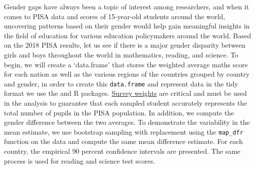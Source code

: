 Gender gaps have always been a topic of interest among researchers, and
when it comes to PISA data and scores of 15-year-old students around the
world, uncovering patterns based on their gender would help gain
meaningful insights in the field of education for various education
policymakers around the world. Based on the 2018 PISA results, let us
see if there is a major gender disparity between girls and boys
throughout the world in mathematics, reading, and science. To begin, we
will create a `data.frame' that stores the weighted average maths score
for each nation as well as the various regions of the countries grouped
by country and gender, in order to create this \texttt{data.frame} and
represent data in the tidy format we use the 
\citep{tidyverse} and  \citep{dplyr} R packages.
\href{https://www.oecd.org/pisa/data/2015-technical-report/PISA-2015-Technical-Report-Chapter-8-Survey-Weighting.pdf}{Survey
weights} are critical and must be used in the analysis to guarantee that
each sampled student accurately represents the total number of pupils in
the PISA population. In addition, we compute the gender difference
between the two averages. To demonstrate the variability in the mean
estimate, we use bootstrap sampling with replacement using the
\texttt{map\_dfr} function on the data and compute the same mean
difference estimate. For each country, the empirical 90 percent
confidence intervals are presented. The same process is used for reading
and science test scores.

